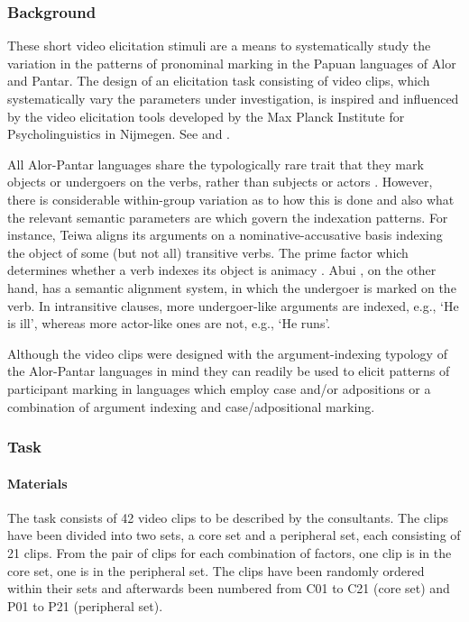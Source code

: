 \subsubsection{Background}

These short video elicitation stimuli are a means to systematically study the variation in the patterns of pronominal marking in the Papuan languages of Alor and Pantar. The design of an elicitation task consisting of video clips, which systematically vary the parameters under investigation, is inspired and influenced by the video elicitation tools developed by the Max Planck Institute for Psycholinguistics in Nijmegen. See \citet{BohnemeyerEtAl2001,BowermanEtAl2004} and \citet{EvansEtAl2004}.

All Alor-Pantar languages share the typologically rare trait that they mark objects or undergoers on the verbs, rather than subjects or actors \citep{Siewierska2013}. However, there is considerable within-group variation as to how this is done and also what the relevant semantic parameters are which govern the indexation patterns. For instance, Teiwa \citep{Klamer2010grammar} aligns its arguments on a nominative-accusative basis indexing the object of some (but not all) transitive verbs. The prime factor which determines whether a verb indexes its object is animacy \citep{KlamerEtAl2006,Klamer2010grammar}. Abui \citep{Kratochvil2007,Kratochvil2011transitivity}, on the other hand, has a semantic alignment system, in which the undergoer is marked on the verb. In intransitive clauses, more undergoer-like arguments are indexed, e.g., `He is ill', whereas more actor-like ones are not, e.g., `He runs'. 

  Although the video clips were designed with the argument-indexing typology of the Alor-Pantar languages in mind they can readily be used to elicit patterns of participant marking in languages which employ case and/or adpositions or a combination of argument indexing and case/adpositional marking. 

\subsubsection{Task}

\paragraph{Materials}

The task consists of 42 video clips to be described by the consultants. The clips have been divided into two sets, a core set and a peripheral set, each consisting of 21 clips. From the pair of clips for each combination of factors, one clip is in the core set, one is in the peripheral set. The clips have been randomly ordered within their sets and afterwards been numbered from C01 to C21 (core set) and P01 to P21 (peripheral set). 

